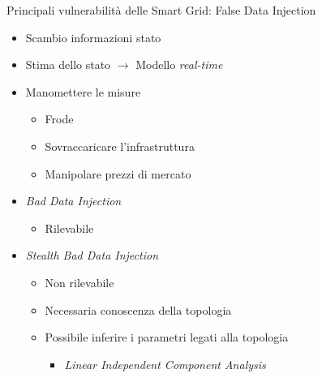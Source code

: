 \begin{frame}{Principali vulnerabilità delle Smart Grid: False Data Injection}
	\begin{itemize}[<+- | alert@+>]
		\item Scambio informazioni stato
		\item Stima dello stato $\rightarrow$ Modello \textit{real-time}
		\item Manomettere le misure
		\begin{itemize}
			\item Frode
			\item Sovraccaricare l'infrastruttura
			\item Manipolare prezzi di mercato
		\end{itemize}
		\item \textit{Bad Data Injection}
		\begin{itemize}
			\item Rilevabile
		\end{itemize}
		\item \textit{Stealth Bad Data Injection}
		\begin{itemize}
			\item Non rilevabile
			\item Necessaria conoscenza della topologia
			\item Possibile inferire i parametri legati alla topologia
			\begin{itemize}
				\item \textit{Linear Independent Component Analysis}
			\end{itemize}
		\end{itemize}
	\end{itemize}
\end{frame}
